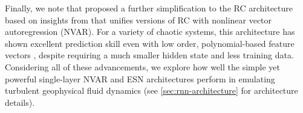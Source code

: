 Finally, we note that \citet{gauthier_next_2021} proposed a further
simplification to the RC architecture based on insights from
\citet{bollt_explaining_2021} that unifies versions of RC with nonlinear vector
autoregression (NVAR).
For a variety of chaotic systems, this architecture has shown excellent prediction skill
even with low order, polynomial-based feature vectors
\citep{chen_next_2022,barbosa_learning_2022,gauthier_next_2021}, despite requiring a much
smaller hidden state and less training data.
Considering all of these advancements, we explore how well the simple yet
powerful single-layer NVAR and ESN architectures perform in emulating turbulent
geophysical fluid dynamics (see \cref{sec:rnn-architecture} for architecture
details).

